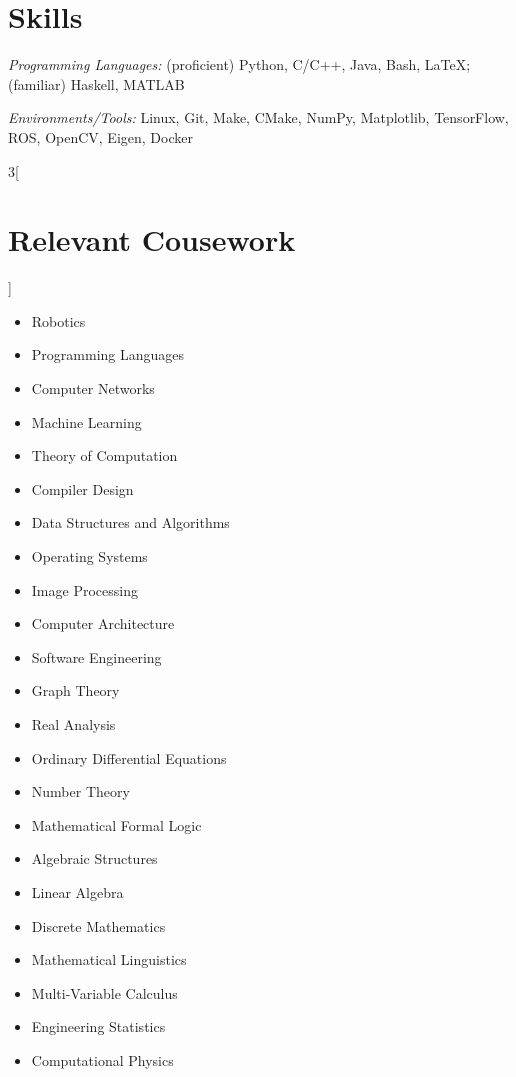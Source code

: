 \documentclass[\ifdefined\cv11pt\else10pt\fi,letterpaper,roman]{moderncv}
\newcommand{\cvonly}[1]{\ifdefined\cv#1\fi}
\newcommand{\resumeonly}[1]{\ifdefined\cv\else#1\fi}
\let\oldsection\section
\renewcommand{\section}[1]{\vspace*{-1.3ex}\oldsection{#1}\vspace*{-0.5ex}}
\begin{document}
\resumeonly{\pagebreak}
\setlength{\premulticols}{0pt}
\section{Skills}
\textit{Programming Languages:} (proficient) Python, C/C++, Java, Bash, \LaTeX; (familiar) Haskell, MATLAB \par
\textit{Environments/Tools:} Linux, Git, Make, CMake, NumPy, Matplotlib, TensorFlow, ROS, OpenCV\cvonly{, Eigen, Docker}

\begin{multicols}{3}[\section{Relevant Cousework}\vspace*{-1.2\topsep}]
\begin{itemize}
	\item Robotics
	\item Programming Languages
	\item Computer Networks
	\item Machine Learning
	\item Theory of Computation
	\item Compiler Design
	\item Data Structures and Algorithms
	\item Operating Systems
	\item Image Processing
	\item Computer Architecture
	\item Software Engineering
	\item Graph Theory
	\item Real Analysis
	\item Ordinary Differential Equations
	\item Number Theory
	\item Mathematical Formal Logic
	\item Algebraic Structures
	\item Linear Algebra
	\item Discrete Mathematics
	\cvonly{
		\item Mathematical Linguistics
		\item Multi-Variable Calculus
		\item Engineering Statistics
		\item Computational Physics
	}
\end{itemize}
\end{multicols}
\vspace{-2.8ex}
\end{document}
